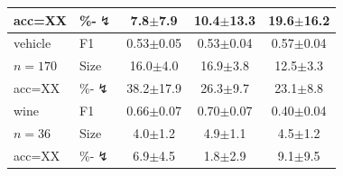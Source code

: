 \begin{tabular}{llccc}
acc=XX & \%-$\lightning$ & 7.8{\scriptsize$\pm$7.9} & 10.4{\scriptsize$\pm$13.3} & 19.6{\scriptsize$\pm$16.2} \\
\midrule
vehicle & F1 & 0.53{\scriptsize$\pm$0.05} & 0.53{\scriptsize$\pm$0.04} & 0.57{\scriptsize$\pm$0.04} \\
$n=170$ & Size & 16.0{\scriptsize$\pm$4.0} & 16.9{\scriptsize$\pm$3.8} & 12.5{\scriptsize$\pm$3.3} \\
acc=XX & \%-$\lightning$ & 38.2{\scriptsize$\pm$17.9} & 26.3{\scriptsize$\pm$9.7} & 23.1{\scriptsize$\pm$8.8} \\
\midrule
wine & F1 & 0.66{\scriptsize$\pm$0.07} & 0.70{\scriptsize$\pm$0.07} & 0.40{\scriptsize$\pm$0.04} \\
$n=36$ & Size & 4.0{\scriptsize$\pm$1.2} & 4.9{\scriptsize$\pm$1.1} & 4.5{\scriptsize$\pm$1.2} \\
acc=XX & \%-$\lightning$ & 6.9{\scriptsize$\pm$4.5} & 1.8{\scriptsize$\pm$2.9} & 9.1{\scriptsize$\pm$9.5} \\
\bottomrule
\end{tabular}